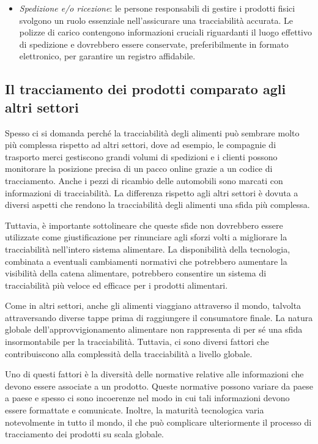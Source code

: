 \begin{itemize}
    \item \textit{Spedizione e/o ricezione}: le persone responsabili di gestire i prodotti fisici svolgono un ruolo essenziale nell'assicurare una tracciabilità accurata. Le polizze di carico contengono informazioni cruciali riguardanti il luogo effettivo di spedizione e dovrebbero essere conservate, preferibilmente in formato elettronico, per garantire un registro affidabile.    
    
\end{itemize}

\subsection{Il tracciamento dei prodotti comparato agli altri settori}

Spesso ci si domanda perché la tracciabilità degli alimenti può sembrare molto più complessa rispetto ad altri settori, dove ad esempio, le compagnie di trasporto merci gestiscono grandi volumi di spedizioni e i clienti possono monitorare la posizione precisa di un pacco online grazie a un codice di tracciamento. Anche i pezzi di ricambio delle automobili sono marcati con informazioni di tracciabilità. La differenza rispetto agli altri settori è dovuta a diversi aspetti che rendono la tracciabilità degli alimenti una sfida più complessa.

Tuttavia, è importante sottolineare che queste sfide non dovrebbero essere utilizzate come giustificazione per rinunciare agli sforzi volti a migliorare la tracciabilità nell'intero sistema alimentare. La disponibilità della tecnologia, combinata a eventuali cambiamenti normativi che potrebbero aumentare la visibilità della catena alimentare, potrebbero consentire un sistema di tracciabilità più veloce ed efficace per i prodotti alimentari.

Come in altri settori, anche gli alimenti viaggiano attraverso il mondo, talvolta attraversando diverse tappe prima di raggiungere il consumatore finale. La natura globale dell'approvvigionamento alimentare non rappresenta di per sé una sfida insormontabile per la tracciabilità. Tuttavia, ci sono diversi fattori che contribuiscono alla complessità della tracciabilità a livello globale.

Uno di questi fattori è la diversità delle normative relative alle informazioni che devono essere associate a un prodotto. Queste normative possono variare da paese a paese e spesso ci sono incoerenze nel modo in cui tali informazioni devono essere formattate e comunicate. Inoltre, la maturità tecnologica varia notevolmente in tutto il mondo, il che può complicare ulteriormente il processo di tracciamento dei prodotti su scala globale.

